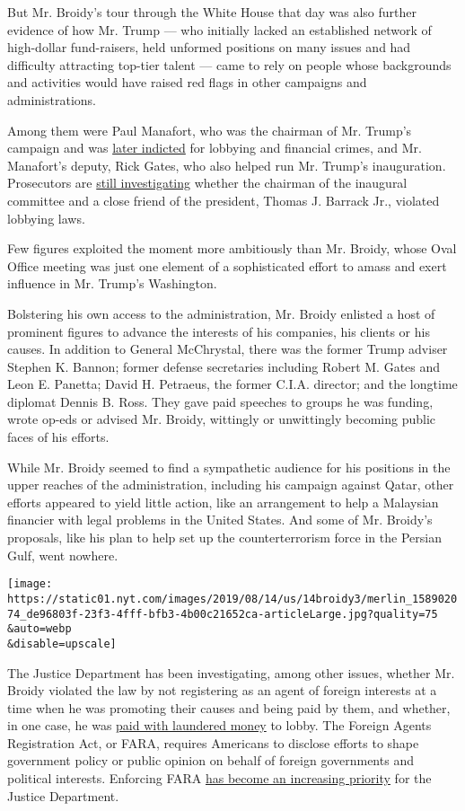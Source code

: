 But Mr. Broidy's tour through the White House that day was also further
evidence of how Mr. Trump --- who initially lacked an established
network of high-dollar fund-raisers, held unformed positions on many
issues and had difficulty attracting top-tier talent --- came to rely on
people whose backgrounds and activities would have raised red flags in
other campaigns and administrations.

Among them were Paul Manafort, who was the chairman of Mr. Trump's
campaign and was
\href{https://www.nytimes.com/2017/10/30/us/politics/paul-manafort-indicted.html}{later
indicted} for lobbying and financial crimes, and Mr. Manafort's deputy,
Rick Gates, who also helped run Mr. Trump's inauguration. Prosecutors
are
\href{https://www.nytimes.com/2019/07/28/us/politics/thomas-barrack-foreign-lobbying.html}{still
investigating} whether the chairman of the inaugural committee and a
close friend of the president, Thomas J. Barrack Jr., violated lobbying
laws.

Few figures exploited the moment more ambitiously than Mr. Broidy, whose
Oval Office meeting was just one element of a sophisticated effort to
amass and exert influence in Mr. Trump's Washington.

Bolstering his own access to the administration, Mr. Broidy enlisted a
host of prominent figures to advance the interests of his companies, his
clients or his causes. In addition to General McChrystal, there was the
former Trump adviser Stephen K. Bannon; former defense secretaries
including Robert M. Gates and Leon E. Panetta; David H. Petraeus, the
former C.I.A. director; and the longtime diplomat Dennis B. Ross. They
gave paid speeches to groups he was funding, wrote op-eds or advised Mr.
Broidy, wittingly or unwittingly becoming public faces of his efforts.

While Mr. Broidy seemed to find a sympathetic audience for his positions
in the upper reaches of the administration, including his campaign
against Qatar, other efforts appeared to yield little action, like an
arrangement to help a Malaysian financier with legal problems in the
United States. And some of Mr. Broidy's proposals, like his plan to help
set up the counterterrorism force in the Persian Gulf, went nowhere.

\texttt{[image: https://static01.nyt.com/images/2019/08/14/us/14broidy3/merlin\_158902074\_de96803f-23f3-4fff-bfb3-4b00c21652ca-articleLarge.jpg?quality=75\\\&auto=webp\\\&disable=upscale]}

The Justice Department has been investigating, among other issues,
whether Mr. Broidy violated the law by not registering as an agent of
foreign interests at a time when he was promoting their causes and being
paid by them, and whether, in one case, he was
\href{https://www.nytimes.com/2018/11/30/us/politics/broidy-trump-foreign-money.html}{paid
with laundered money} to lobby. The Foreign Agents Registration Act, or
FARA, requires Americans to disclose efforts to shape government policy
or public opinion on behalf of foreign governments and political
interests. Enforcing FARA
\href{https://www.nytimes.com/2019/03/06/us/politics/fara-task-force-justice-department.html}{has
become an increasing priority} for the Justice Department.

